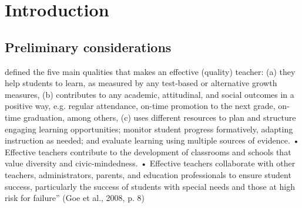 \chapter{Introduction}
%
\section{Preliminary considerations}
%
\citet{Goe_et_al_2008} defined the five main qualities that makes an effective (quality) teacher: (a) they help students to learn, as measured by any test-based or alternative growth measures, (b) contributes to any academic, attitudinal, and social outcomes in a positive way, e.g. regular attendance, on-time promotion to
the next grade, on-time graduation, among others, (c) uses different resources to plan and structure engaging
learning opportunities; monitor student progress formatively, adapting
instruction as needed; and evaluate learning using multiple sources of
evidence.
• Effective teachers contribute to the development of classrooms and schools
that value diversity and civic-mindedness.
• Effective teachers collaborate with other teachers, administrators, parents,
and education professionals to ensure student success, particularly the
success of students with special needs and those at high risk for failure”
(Goe et al., 2008, p. 8)


